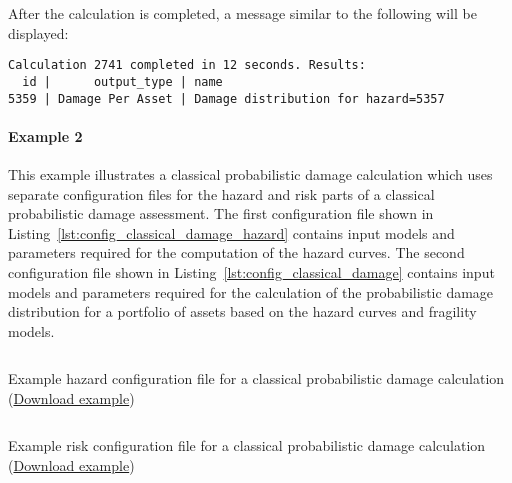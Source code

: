 After the calculation is completed, a message similar to the following will be
displayed:

\begin{verbatim}
Calculation 2741 completed in 12 seconds. Results:
  id |      output_type | name
5359 | Damage Per Asset | Damage distribution for hazard=5357
\end{verbatim}


\paragraph{Example 2}

This example illustrates a classical probabilistic damage calculation which
uses separate configuration files for the hazard and risk parts of a classical
probabilistic damage assessment. The first configuration file shown in
Listing~\ref{lst:config_classical_damage_hazard} contains input models and parameters
required for the computation of the hazard curves. The second configuration
file shown in Listing~\ref{lst:config_classical_damage} contains input models
and parameters required for the calculation of the probabilistic damage
distribution for a portfolio of assets based on the hazard curves and
fragility models.

\begin{listing}[htbp]
  \inputminted[firstline=1,firstnumber=1,fontsize=\footnotesize,frame=single,linenos,bgcolor=lightgray,label=job\_hazard.ini]{ini}{oqum/risk/verbatim/config_classical_hazard.ini}
  \caption{Example hazard configuration file for a classical probabilistic damage calculation (\href{https://raw.githubusercontent.com/GEMScienceTools/oq-engine-docs/master/oqum/risk/verbatim/config_classical_hazard.ini}{Download example})}
  \label{lst:config_classical_damage_hazard}
\end{listing}

\begin{listing}[htbp]
  \inputminted[firstline=1,firstnumber=1,fontsize=\footnotesize,frame=single,linenos,bgcolor=lightgray,label=job\_damage.ini]{ini}{oqum/risk/verbatim/config_classical_damage.ini}
  \caption{Example risk configuration file for a classical probabilistic damage calculation (\href{https://raw.githubusercontent.com/GEMScienceTools/oq-engine-docs/master/oqum/risk/verbatim/config_classical_damage.ini}{Download example})}
  \label{lst:config_classical_damage}
\end{listing}

